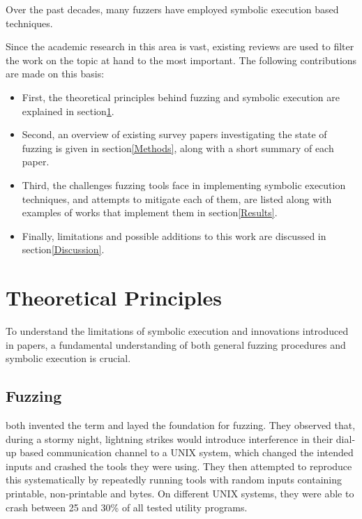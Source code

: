 \documentclass{article}
\begin{document}
\begin{multicols}{2}
    Over the past decades, many fuzzers\cite{BitBlaze,CORAL,CREST,CUTE,CVC5,CVCLite,Chopped,Cyberdyne,DART,DTSA,DiSE,DigFuzz,Dowser,Driller,EGT,EXE,Fitnex,FloPSy,GRT,GSE,HCT,HFL,IFL,Intriguer,JFI,KATCH,KLEE,KLEEFP,LATEST,MoWF,Moles,PYGMALION,Pangolin,Pex,QSYM,QuickFuzz,RWset,SAGE,SAVIOR,SMART,SPIN,STP,ScalableAutomatedMethods,TFuzz,TaintScope,VUzzer} have employed symbolic execution based techniques.

    Since the academic research in this area is vast, existing reviews are used to filter the work on the topic at hand to the most important. The following contributions are made on this basis:
    \begin{itemize}
        \item First, the theoretical principles behind fuzzing and symbolic execution are explained in section\ref{Theory}.
        \item Second, an overview of existing survey papers investigating the state of fuzzing is given in section\ref{Methods}, along with a short summary of each paper.
        \item Third, the challenges fuzzing tools face in implementing symbolic execution techniques, and attempts to mitigate each of them, are listed along with examples of works that implement them in section\ref{Results}.
        \item Finally, limitations and possible additions to this work are discussed in section\ref{Discussion}.
    \end{itemize}


    \section{Theoretical Principles}
    \label{Theory}

    To understand the limitations of symbolic execution and innovations introduced in papers, a fundamental understanding of both general fuzzing procedures and symbolic execution is crucial.

    \subsection{Fuzzing}

    \citeauthor{UNIX} both invented the term and layed the foundation for fuzzing. They observed that, during a stormy night, lightning strikes would introduce interference in their dial-up based communication channel to a UNIX system, which changed the intended inputs and crashed the tools they were using. They then attempted to reproduce this systematically by repeatedly running tools with random inputs containing printable, non-printable and  bytes. On different UNIX systems, they were able to crash between 25 and 30\% of all tested utility programs.\cite{UNIX}


\end{multicols}
\end{document}
